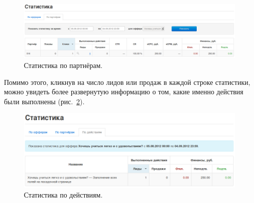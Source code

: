 \documentclass[a4paper,12pt]{article}
\begin{document}
\begin{figure}[!ht]
\centering
\includegraphics[width=\textwidth]{include/stats-aff.png}
\caption{Статистика по партнёрам.}
\label{fig:stats-aff}
\end{figure}

Помимо этого, кликнув на число лидов или продаж в каждой строке статистики, можно увидеть более развернутую информацию о том, какие именно действия были выполнены (рис.~\ref{fig:stats-suboffer}).

\begin{figure}[!ht]
\centering
\includegraphics[width=\textwidth]{include/stats-suboffer.png}
\caption{Статистика по действиям.}
\label{fig:stats-suboffer}
\end{figure}
\end{document}
